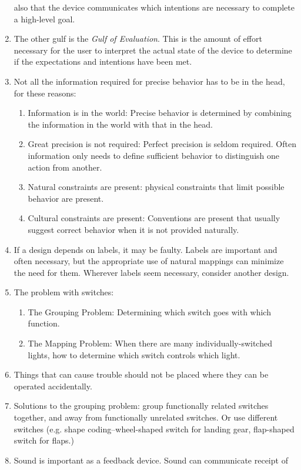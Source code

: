 \documentclass{designdoc}
\begin{document}
\begin{enumerate}
  also that the device communicates which intentions are necessary to complete
  a high-level goal.
\item The other gulf is the \textit{Gulf of Evaluation}. This is the amount of
  effort necessary for the user to interpret the actual state of the device to
  determine if the expectations and intentions have been met.
\item Not all the information required for precise behavior has to be in the
  head, for these reasons:
  \begin{enumerate}
  \item Information is in the world: Precise behavior is determined by
    combining the information in the world with that in the head.
  \item Great precision is not required: Perfect precision is seldom required.
    Often information only needs to define sufficient behavior to distinguish
    one action from another.
  \item Natural constraints are present: physical constraints that limit
    possible behavior are present.
  \item Cultural constraints are present: Conventions are present that usually
    suggest correct behavior when it is not provided naturally.
  \end{enumerate}
\item If a design depends on labels, it may be faulty. Labels are important and
  often necessary, but the appropriate use of natural mappings can minimize the
  need for them. Wherever labels seem necessary, consider another design.
\item The problem with switches:
  \begin{enumerate}
  \item The Grouping Problem: Determining which switch goes with which
    function.
  \item The Mapping Problem: When there are many individually-switched lights,
    how to determine which switch controls which light.
  \end{enumerate}
\item Things that can cause trouble should not be placed where they can be
  operated accidentally.
\item Solutions to the grouping problem: group functionally related switches
  together, and away from functionally unrelated switches. Or use different
  switches (e.g. shape coding--wheel-shaped switch for landing gear,
  flap-shaped switch for flaps.)
\item Sound is important as a feedback device. Sound can communicate receipt of

\end{enumerate}
\end{document}
